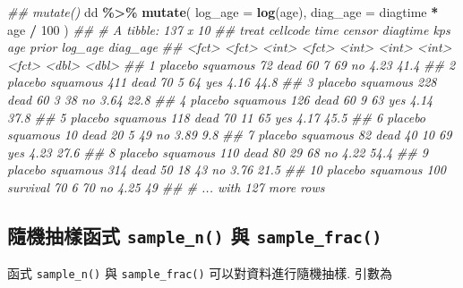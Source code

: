 \documentclass[
]{book}
\newenvironment{Shaded}{\begin{snugshade}}{\end{snugshade}}
\newcommand{\CommentTok}[1]{\textcolor[rgb]{0.56,0.35,0.01}{\textit{#1}}}
\newcommand{\DataTypeTok}[1]{\textcolor[rgb]{0.13,0.29,0.53}{#1}}
\newcommand{\DecValTok}[1]{\textcolor[rgb]{0.00,0.00,0.81}{#1}}
\newcommand{\KeywordTok}[1]{\textcolor[rgb]{0.13,0.29,0.53}{\textbf{#1}}}
\newcommand{\NormalTok}[1]{#1}
\newcommand{\OperatorTok}[1]{\textcolor[rgb]{0.81,0.36,0.00}{\textbf{#1}}}
\newcommand{\StringTok}[1]{\textcolor[rgb]{0.31,0.60,0.02}{#1}}
\begin{document}
\begin{Shaded}
\begin{Highlighting}[]
\CommentTok{\#\# mutate()}
\NormalTok{dd }\OperatorTok{\%\textgreater{}\%}\StringTok{ }
\StringTok{  }\KeywordTok{mutate}\NormalTok{(}
    \DataTypeTok{log\_age =} \KeywordTok{log}\NormalTok{(age),}
    \DataTypeTok{diag\_age =}\NormalTok{ diagtime }\OperatorTok{*}\StringTok{ }\NormalTok{age }\OperatorTok{/}\StringTok{ }\DecValTok{100}
\NormalTok{    )}
\CommentTok{\#\# \# A tibble: 137 x 10}
\CommentTok{\#\#    treat   cellcode  time censor   diagtime   kps   age prior log\_age diag\_age}
\CommentTok{\#\#    \textless{}fct\textgreater{}   \textless{}fct\textgreater{}    \textless{}int\textgreater{} \textless{}fct\textgreater{}       \textless{}int\textgreater{} \textless{}int\textgreater{} \textless{}int\textgreater{} \textless{}fct\textgreater{}   \textless{}dbl\textgreater{}    \textless{}dbl\textgreater{}}
\CommentTok{\#\#  1 placebo squamous    72 dead           60     7    69 no       4.23     41.4}
\CommentTok{\#\#  2 placebo squamous   411 dead           70     5    64 yes      4.16     44.8}
\CommentTok{\#\#  3 placebo squamous   228 dead           60     3    38 no       3.64     22.8}
\CommentTok{\#\#  4 placebo squamous   126 dead           60     9    63 yes      4.14     37.8}
\CommentTok{\#\#  5 placebo squamous   118 dead           70    11    65 yes      4.17     45.5}
\CommentTok{\#\#  6 placebo squamous    10 dead           20     5    49 no       3.89      9.8}
\CommentTok{\#\#  7 placebo squamous    82 dead           40    10    69 yes      4.23     27.6}
\CommentTok{\#\#  8 placebo squamous   110 dead           80    29    68 no       4.22     54.4}
\CommentTok{\#\#  9 placebo squamous   314 dead           50    18    43 no       3.76     21.5}
\CommentTok{\#\# 10 placebo squamous   100 survival       70     6    70 no       4.25     49  }
\CommentTok{\#\# \# ... with 127 more rows}
\end{Highlighting}
\end{Shaded}

\hypertarget{ux96a8ux6a5fux62bdux6a23ux51fdux5f0f-sample_n-ux8207-sample_frac}{%
\subsection{\texorpdfstring{隨機抽樣函式 \texttt{sample\_n()} 與 \texttt{sample\_frac()}}{隨機抽樣函式 sample\_n() 與 sample\_frac()}}\label{ux96a8ux6a5fux62bdux6a23ux51fdux5f0f-sample_n-ux8207-sample_frac}}

函式 \texttt{sample\_n()} 與 \texttt{sample\_frac()}
可以對資料進行隨機抽樣.
引數為
\end{document}
